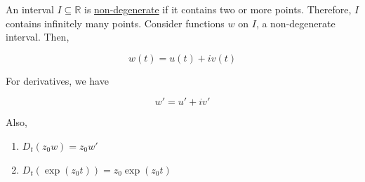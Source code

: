 \documentclass{article}
\newtheorem{one minute paper}[theorem]{One Minute Paper}
\begin{document}
An interval $I \subseteq \mathbb{R}$ is \underline{non-degenerate} if it contains two or more points. Therefore, $I$ contains infinitely many points. Consider functions $w$ on $I$, a non-degenerate interval. Then, 

\begin{equation}
    w(t) = u(t) + iv(t)
\end{equation}

For derivatives, we have 

\begin{equation}
    w' = u' + iv'
\end{equation}

Also, 

\begin{enumerate}
    \item $D_t(z_0 w) = z_0 w'$
    \item $D_t(\exp(z_0 t)) = z_0 \exp(z_0 t)$
\end{enumerate}
\end{document}
